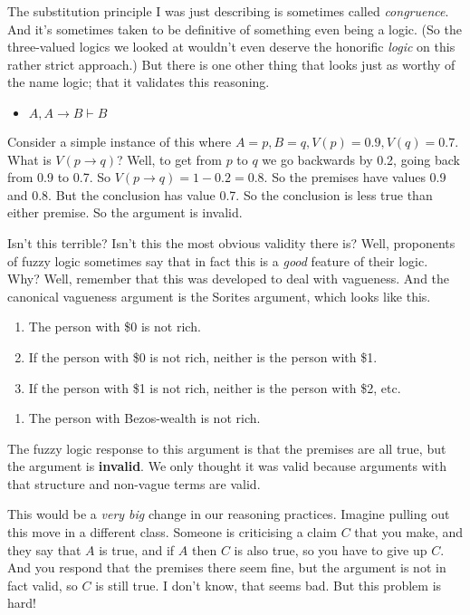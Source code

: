 \documentclass[
]{article}
\providecommand{\tightlist}{%
  \setlength{\itemsep}{0pt}\setlength{\parskip}{0pt}}\usepackage{longtable,booktabs,array}
\begin{document}
The substitution principle I was just describing is sometimes called
\emph{congruence}. And it's sometimes taken to be definitive of
something even being a logic. (So the three-valued logics we looked at
wouldn't even deserve the honorific \emph{logic} on this rather strict
approach.) But there is one other thing that looks just as worthy of the
name logic; that it validates this reasoning.

\begin{itemize}
\tightlist
\item
  \(A, A \rightarrow B \vdash B\)
\end{itemize}

Consider a simple instance of this where
\(A = p, B = q, V(p) = 0.9, V(q) = 0.7\). What is
\(V(p \rightarrow q)\)? Well, to get from \(p\) to \(q\) we go backwards
by 0.2, going back from 0.9 to 0.7. So
\(V(p \rightarrow q) = 1 - 0.2 = 0.8\). So the premises have values 0.9
and 0.8. But the conclusion has value 0.7. So the conclusion is less
true than either premise. So the argument is invalid.

Isn't this terrible? Isn't this the most obvious validity there is?
Well, proponents of fuzzy logic sometimes say that in fact this is a
\emph{good} feature of their logic. Why? Well, remember that this was
developed to deal with vagueness. And the canonical vagueness argument
is the Sorites argument, which looks like this.

\begin{enumerate}
\def\labelenumi{\arabic{enumi}.}
\setcounter{enumi}{-1}
\tightlist
\item
  The person with \$0 is not rich.
\item
  If the person with \$0 is not rich, neither is the person with \$1.
\item
  If the person with \$1 is not rich, neither is the person with \$2,
  etc.
\end{enumerate}

\begin{enumerate}
\def\labelenumi{\Alph{enumi}.}
\setcounter{enumi}{2}
\tightlist
\item
  The person with Bezos-wealth is not rich.
\end{enumerate}

The fuzzy logic response to this argument is that the premises are all
true, but the argument is \textbf{invalid}. We only thought it was valid
because arguments with that structure and non-vague terms are valid.

This would be a \emph{very big} change in our reasoning practices.
Imagine pulling out this move in a different class. Someone is
criticising a claim \(C\) that you make, and they say that \(A\) is
true, and if \(A\) then \(C\) is also true, so you have to give up
\(C\). And you respond that the premises there seem fine, but the
argument is not in fact valid, so \(C\) is still true. I don't know,
that seems bad. But this problem is hard!
\end{document}
